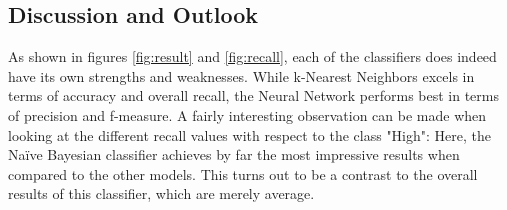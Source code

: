

\subsection{Discussion and Outlook}

As shown in figures \ref{fig:result} and \ref{fig:recall}, each of the
classifiers does indeed have its own strengths and weaknesses.
While k-Nearest Neighbors excels in terms of accuracy and overall
recall, the Neural Network performs best in terms of precision and
f-measure. A fairly interesting observation can be made when looking
at the different recall values with respect to the class "High":
Here, the Na\"ive Bayesian classifier achieves by far the most impressive
results when compared to the other models. This turns out to be a
contrast to the overall results of this classifier, which are merely average.

